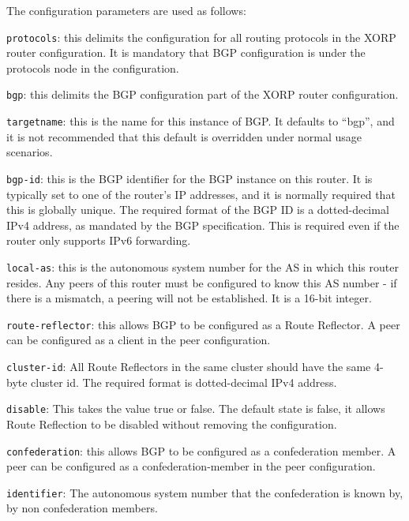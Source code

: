\noindent
The configuration parameters are used as follows:
\begin{description}
\item{\tt protocols}: this delimits the configuration for all routing
  protocols in the XORP router configuration.  It is mandatory that
  BGP configuration is under the {\stt protocols} node in the
  configuration.
\item{\tt bgp}: this delimits the BGP configuration part of the XORP
  router configuration.
\item{\tt targetname}: this is the name for this instance of BGP.  It
  defaults to ``{\stt bgp}'', and it is not recommended that this
  default is overridden under normal usage scenarios.
\item{\tt bgp-id}: this is the BGP identifier for the BGP instance on
  this router.  It is typically set to one of the router's IP
  addresses, and it is normally required that this is globally unique.
  The required format of the BGP ID is a dotted-decimal IPv4 address,
  as mandated by the BGP specification.  This is required even if the
  router only supports IPv6 forwarding.
\item{\tt local-as}: this is the autonomous system number for the AS
  in which this router resides.  Any peers of this router must be
  configured to know this AS number - if there is a mismatch, a
  peering will not be established.  It is a 16-bit integer.
\item{\tt route-reflector}: this allows BGP to be configured as a
Route Reflector. A peer can be configured as a client in the peer
configuration.
\begin{description}
\item{\tt cluster-id}: All Route Reflectors in the same cluster should
have the same 4-byte cluster id. The required format is dotted-decimal
IPv4 address.
\item{\tt disable}: This takes the value {\stt true} or {\stt
false}. The default state is {\stt false}, it allows Route Reflection
to be disabled without removing the configuration.
\end{description}
\item{\tt confederation}: this allows BGP to be configured as a
confederation member. A peer can be configured as a
confederation-member in the peer configuration.
\begin{description}
\item{\tt identifier}: The autonomous system number that the
confederation is known by, by non confederation members.

\end{description}
\end{description}
